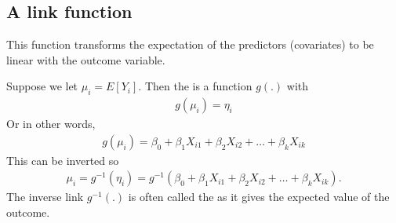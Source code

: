 \documentclass[letterpaper,10pt,english]{jupyterBook}
\begin{document}
\subsection{A link function}
\label{\detokenize{16.c. Generalised Linear Model (GLM):a-link-function}}
\sphinxAtStartPar
This function transforms the expectation of the predictors (covariates) to be linear with the outcome variable.

\sphinxAtStartPar
Suppose we let \(\mu_{i} = E[Y_{i}]\). Then the  is a function \(g(.)\) with
\begin{equation*}
\begin{split}
g(\mu_{i} ) = \eta_{i} 
\end{split}
\end{equation*}
\sphinxAtStartPar
Or in other words,
\begin{equation*}
\begin{split}
g(\mu_{i} ) = \beta_{0} + \beta_{1}X_{i1} + \beta_{2}X_{i2} + … + \beta_{k}X_{ik}
\end{split}
\end{equation*}
\sphinxAtStartPar
This can be inverted so
\begin{equation*}
\begin{split}
\mu_{i}  = g^{-1}(\eta_{i}) = g^{-1}(\beta_{0} + \beta_{1}X_{i1} + \beta_{2}X_{i2} + … + \beta_{k}X_{ik}).
\end{split}
\end{equation*}
\sphinxAtStartPar
The inverse link \(g^{-1}(.)\) is often called the  as it  gives the expected value of the outcome.
\end{document}

